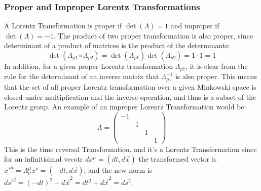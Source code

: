 \documentclass{article}
\begin{document}
\subsubsection{Proper and Improper Lorentz Transformations}
A Lorentz Transformation is proper if $\det(\Lambda) = 1$ and improper if $\det(\Lambda) = -1$. The product of two proper transformation is also proper, since determinant of a product of matrices is the product of the determinants:
\begin{equation}
    \det(\Lambda_{p1}\circ\Lambda_{p2}) = \det(\Lambda_{p1})\det(\Lambda_{p2}) = 1\cdot1 = 1
\end{equation}
In addition, for a given proper Lorentz transformation $\Lambda_{p1}$, it is clear from the rule for the determinant of an inverse matrix that $\Lambda_{p1}^{-1}$ is also proper. 
This means that the set of all proper Lorentz transformation over a given Minkowski space is closed under multiplication and the inverse operation, and thus is a subset of the Lorentz group.
\newline
An example of an improper Lorentz Transformation would be:
\begin{equation}
    \Lambda = \begin{pmatrix}
        -1 & & & \\
        & 1 & & \\
        & & 1 & \\
        & & & 1
    \end{pmatrix}
\end{equation}
This is the time reversal Transformation, and it's a Lorentz Transformation since for an infinitisimal vecotr $dx^\mu = (dt, d\vec{x})$ the transformed vector is ${x'}^\mu = \Lambda^\mu_\nu x^\nu = (-dt, d\vec{x})$, and the new norm is ${ds'}^2 = (-dt)^2 + d\vec{x}^2 = dt^2 + d\vec{x}^2 = ds^2$.
\end{document}
